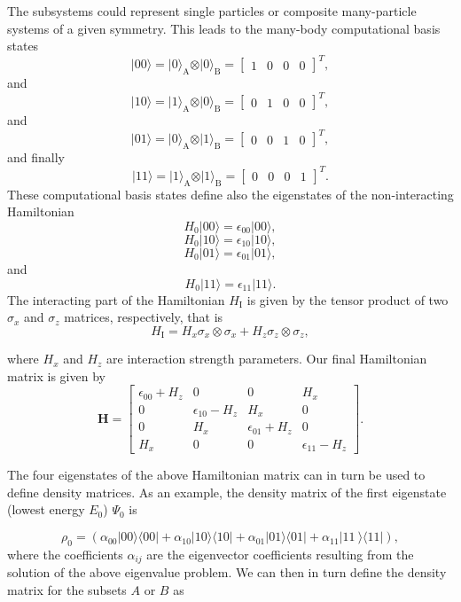 \documentclass[twocolumn,superscriptaddress,unsortedaddress,
 amsmath,amssymb,
 aps,
]{revtex4-2}
\begin{document}
The subsystems could represent single particles or composite many-particle systems of a given symmetry.
This leads to the many-body computational basis states
\[
\vert 00\rangle = \vert 0\rangle_{\mathrm{A}}\otimes \vert 0\rangle_{\mathrm{B}}=\begin{bmatrix} 1 & 0 & 0 &0\end{bmatrix}^T,
\]
and
\[
\vert 10\rangle = \vert 1\rangle_{\mathrm{A}}\otimes \vert 0\rangle_{\mathrm{B}}=\begin{bmatrix} 0 & 1 & 0 &0\end{bmatrix}^T,
\]
and
\[
\vert 01\rangle = \vert 0\rangle_{\mathrm{A}}\otimes \vert 1\rangle_{\mathrm{B}}=\begin{bmatrix} 0 & 0 & 1 &0\end{bmatrix}^T,
\]
and finally
\[
\vert 11\rangle = \vert 1\rangle_{\mathrm{A}}\otimes \vert 1\rangle_{\mathrm{B}}=\begin{bmatrix} 0 & 0 & 0 &1\end{bmatrix}^T.
\]
These computational basis states define also the eigenstates of the non-interacting  Hamiltonian
\[
H_0\vert 00 \rangle = \epsilon_{00}\vert 00 \rangle,
\]
\[
H_0\vert 10 \rangle = \epsilon_{10}\vert 10 \rangle,
\]
\[
H_0\vert 01 \rangle = \epsilon_{01}\vert 01 \rangle,
\]
and
\[
H_0\vert 11 \rangle = \epsilon_{11}\vert 11 \rangle.
\]
The interacting part of the Hamiltonian $H_{\mathrm{I}}$ is given by the tensor product of two $\sigma_x$ and $\sigma_z$  matrices, respectively, that is
\[
H_{\mathrm{I}}=H_x\sigma_x\otimes\sigma_x+H_z\sigma_z\otimes\sigma_z,
\]

where $H_x$ and $H_z$ are interaction strength parameters. Our final Hamiltonian matrix is given by
\[
\bm{H}=\begin{bmatrix} \epsilon_{00}+H_z & 0 & 0 & H_x \\
                       0  & \epsilon_{10}-H_z & H_x & 0 \\
                       0 & H_x & \epsilon_{01}+H_z & 0 \\
                       H_x & 0 & 0 & \epsilon_{11} -H_z \end{bmatrix}.
\]

The four eigenstates of the above Hamiltonian matrix can in turn be used to
define density matrices. As an example, the density matrix of the
first eigenstate (lowest energy $E_0$) $\Psi_0$ is

\[
\rho_0=\left(\alpha_{00}\vert 00 \rangle\langle 00\vert+\alpha_{10}\vert 10 \rangle\langle 10\vert+\alpha_{01}\vert 01 \rangle\langle 01\vert+\alpha_{11}\vert 11\
 \rangle\langle 11\vert\right),
\]
where the coefficients $\alpha_{ij}$ are the eigenvector coefficients
resulting from the solution of the above eigenvalue problem.  We can
then in turn define the density matrix for the subsets $A$ or $B$ as
\end{document}
